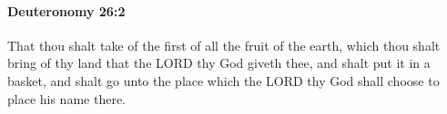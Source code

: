 
		\paragraph{Deuteronomy 26:2} %
			\label{DEUTERONOMY-26-2}

			That thou shalt take of the first of all the fruit of the earth, which thou shalt bring of thy land that the LORD thy God giveth thee, and shalt put it in a basket, and shalt go unto the place which the LORD thy God shall choose to place his name there.


